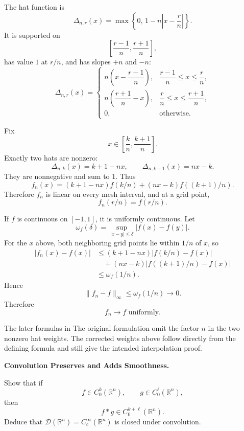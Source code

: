 \begin{solution}
The hat function is
\[
\Delta_{n,r}(x)
=
\max\left\{
0,\,
1-n\left|x-\frac rn\right|
\right\}.
\]
It is supported on
\[
\left[\frac{r-1}{n},\frac{r+1}{n}\right],
\]
has value \(1\) at \(r/n\), and has slopes \(+n\) and \(-n\):
\[
\Delta_{n,r}(x)
=
\begin{cases}
n\left(x-\dfrac{r-1}{n}\right),
&
\dfrac{r-1}{n}\le x\le\dfrac rn,\\[2mm]
n\left(\dfrac{r+1}{n}-x\right),
&
\dfrac rn\le x\le\dfrac{r+1}{n},\\[2mm]
0,&\text{otherwise}.
\end{cases}
\]

Fix
\[
x\in\left[\frac kn,\frac{k+1}{n}\right].
\]
Exactly two hats are nonzero:
\[
\Delta_{n,k}(x)=k+1-nx,
\qquad
\Delta_{n,k+1}(x)=nx-k.
\]
They are nonnegative and sum to \(1\). Thus
\[
f_n(x)
=
(k+1-nx)f(k/n)
+
(nx-k)f((k+1)/n).
\]
Therefore \(f_n\) is linear on every mesh interval, and at a grid point,
\[
\boxed{
f_n(r/n)=f(r/n).
}
\]

If \(f\) is continuous on \([-1,1]\), it is uniformly continuous. Let
\[
\omega_f(\delta)
=
\sup_{|x-y|\le\delta}|f(x)-f(y)|.
\]
For the \(x\) above, both neighboring grid points lie within \(1/n\) of \(x\), so
\[
\begin{aligned}
|f_n(x)-f(x)|
&\le
(k+1-nx)|f(k/n)-f(x)|\\
&\quad+
(nx-k)|f((k+1)/n)-f(x)|\\
&\le
\omega_f(1/n).
\end{aligned}
\]
Hence
\[
\|f_n-f\|_\infty
\le
\omega_f(1/n)
\longrightarrow0.
\]
Therefore
\[
\boxed{f_n\to f\text{ uniformly}.}
\]

The later formulas in The original formulation omit the factor \(n\) in the two nonzero hat
weights. The corrected weights above follow directly from the defining formula and still
give the intended interpolation proof.
\end{solution}


\begin{problem}[CP-II-0066]
\label{prob:cp-ii-0066}
\textbf{Convolution Preserves and Adds Smoothness.}

\hspace*{1.5em}Show that if
\[
f\in C_0^k(\mathbb R^n),
\qquad
g\in C_0^\ell(\mathbb R^n),
\]
then
\[
f*g\in C_0^{k+\ell}(\mathbb R^n).
\]
Deduce that \(\mathcal D(\mathbb R^n)=C_c^\infty(\mathbb R^n)\) is closed under convolution.
\end{problem}

